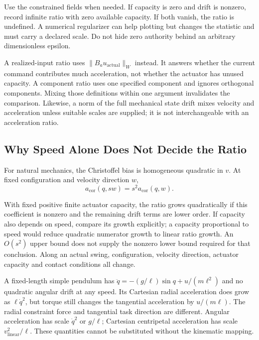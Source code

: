 Use the constrained fields when needed. If capacity is zero and drift is nonzero, record infinite ratio with zero available capacity. If both vanish, the ratio is undefined. A numerical regularizer can help plotting but changes the statistic and must carry a declared scale. Do not hide zero authority behind an arbitrary dimensionless epsilon.

A realized-input ratio uses $\|B_a u_{\mathrm{actual}}\|_W$ instead. It answers whether the current command contributes much acceleration, not whether the actuator has unused capacity. A component ratio uses one specified component and ignores orthogonal components. Mixing those definitions within one argument invalidates the comparison. Likewise, a norm of the full mechanical state drift mixes velocity and acceleration unless suitable scales are supplied; it is not interchangeable with an acceleration ratio.

\subsection{Why Speed Alone Does Not Decide the Ratio}
For natural mechanics, the Christoffel bias is homogeneous quadratic in $v$. At fixed configuration and velocity direction $w$,
\begin{equation}
a_{\mathrm{cor}}(q,sw)=s^2a_{\mathrm{cor}}(q,w).
\label{eq:ch7:DCR-scaling}
\end{equation}

With fixed positive finite actuator capacity, the ratio grows quadratically if this coefficient is nonzero and the remaining drift terms are lower order. If capacity also depends on speed, compare its growth explicitly; a capacity proportional to speed would reduce quadratic numerator growth to linear ratio growth. An $O(s^2)$ upper bound does not supply the nonzero lower bound required for that conclusion. Along an actual swing, configuration, velocity direction, actuator capacity and contact conditions all change.

A fixed-length simple pendulum has $\ddot q=-(g/\ell)\sin q+u/(m\ell^2)$ and no quadratic angular drift at any speed. Its Cartesian radial acceleration does grow as $\ell\dot q^2$, but torque still changes the tangential acceleration by $u/(m\ell)$. The radial constraint force and tangential task direction are different. Angular acceleration has scale $\dot q^2$ or $g/\ell$; Cartesian centripetal acceleration has scale $v_{\mathrm{linear}}^2/\ell$. These quantities cannot be substituted without the kinematic mapping.

